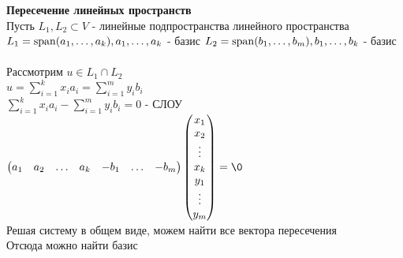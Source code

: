 \documentclass[12pt]{article}
\begin{document}
\textbf{Пересечение линейных пространств}\\
Пусть $L_1, L_2 \subset V$ - линейные подпространства линейного пространства\\
$L_1 = \operatorname{span} (a_1, \ldots, a_k), a_1, \ldots, a_k$ - базис
$L_2 = \operatorname{span} (b_1, \ldots, b_m), b_1, \ldots, b_k$ - базис\\\\
Рассмотрим $u \in L_1 \cap L_2$\\
$u = \sum_{i=1}^k x_i a_i = \sum_{i=1}^m y_i b_i$\\
$\sum_{i=1}^k x_i a_i - \sum_{i=1}^m y_i b_i = 0$ - СЛОУ\\
$\begin{pmatrix}
    a_1 & a_2 & \ldots & a_k & -b_1 & \ldots & -b_m
\end{pmatrix}\begin{pmatrix}
    x_1\\x_2\\\vdots\\x_k\\y_1\\\vdots\\y_m
\end{pmatrix} = \0$\\
Решая систему в общем виде, можем найти все вектора пересечения\\
Отсюда можно найти базис\\
\end{document}
